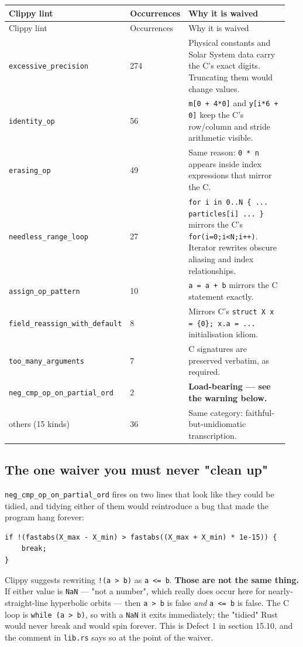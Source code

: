 \documentclass[11pt]{article}
\begin{document}
\begin{longtable}{L{0.150\linewidth}L{0.096\linewidth}L{0.704\linewidth}}
\toprule
Clippy lint & Occurrences & Why it is waived \\
\midrule
\endfirsthead
\toprule
Clippy lint & Occurrences & Why it is waived \\
\midrule
\endhead
\texttt{excessive\_precision} & 274 & Physical constants and Solar System data carry the C's exact digits. Truncating them would change values. \\
\texttt{identity\_op} & 56 & \texttt{m[0 + 4*0]} and \texttt{y[i*6 + 0]} keep the C's row/column and stride arithmetic visible. \\
\texttt{erasing\_op} & 49 & Same reason: \texttt{0 * n} appears inside index expressions that mirror the C. \\
\texttt{needless\_range\_loop} & 27 & \texttt{for i in 0..N \{ ... particles[i] ... \}} mirrors the C's \texttt{for(i=0;i<N;i++)}. Iterator rewrites obscure aliasing and index relationships. \\
\texttt{assign\_op\_pattern} & 10 & \texttt{a = a + b} mirrors the C statement exactly. \\
\texttt{field\_reassign\_with\_default} & 8 & Mirrors C's \texttt{struct X x = \{0\}; x.a = ...} initialisation idiom. \\
\texttt{too\_many\_arguments} & 7 & C signatures are preserved verbatim, as required. \\
\texttt{neg\_cmp\_op\_on\_partial\_ord} & 2 & \textbf{Load-bearing --- see the warning below.} \\
others (15 kinds) & 36 & Same category: faithful-but-unidiomatic transcription. \\
\bottomrule
\end{longtable}

\subsection{The one waiver you must never "clean up"}

\texttt{neg\_cmp\_op\_on\_partial\_ord} fires on two lines that look like they could be tidied, and tidying either of them would reintroduce a bug that made the program hang forever:

\begin{lstlisting}
if !(fastabs(X_max - X_min) > fastabs((X_max + X_min) * 1e-15)) {
    break;
}
\end{lstlisting}

Clippy suggests rewriting \texttt{!(a > b)} as \texttt{a <= b}. \textbf{Those are not the same thing.} If either value is \texttt{NaN} --- "not a number", which really does occur here for nearly-straight-line hyperbolic orbits --- then \texttt{a > b} is false \emph{and} \texttt{a <= b} is false. The C loop is \texttt{while (a > b)}, so with a \texttt{NaN} it exits immediately; the "tidied" Rust would never break and would spin forever. This is Defect 1 in section 15.10, and the comment in \texttt{lib.rs} says so at the point of the waiver.
\end{document}
